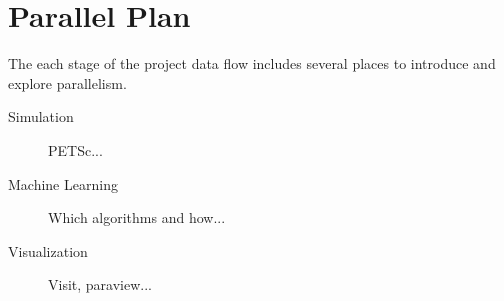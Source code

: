\section{Parallel Plan}

The each stage of the project data flow includes several places to introduce and explore parallelism.

\begin{description}
\item[Simulation] PETSc...
\item[Machine Learning] Which algorithms and how...
\item[Visualization] Visit, paraview...

\end{description}



